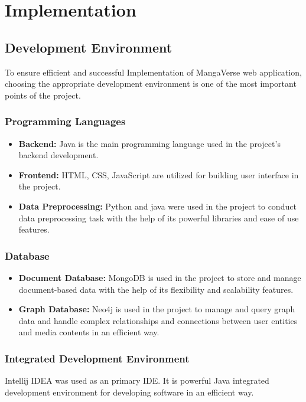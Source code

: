 \chapter{Implementation}

\section{Development Environment}
To ensure efficient and successful Implementation of MangaVerse web application,
choosing the appropriate development environment is one of the most important points of the project.

\subsection*{Programming Languages}
\begin{itemize}
    \item \textbf{Backend:} Java is the main programming language used in the project’s backend development.
    \item \textbf{Frontend:} HTML, CSS, JavaScript are utilized for building user interface in the project.
    \item \textbf{Data Preprocessing:} Python and java were used in the project to conduct data preprocessing task with the help of its powerful libraries and ease of use features. 
\end{itemize}

\subsection*{Database}
\begin{itemize}
    \item \textbf{Document Database:} MongoDB is used in the project to store and manage document-based data with the help of its flexibility and scalability features.
    \item \textbf{Graph Database:} Neo4j is used in the project to manage and query graph data and handle complex relationships and connections between user entities and media contents in an efficient way.
\end{itemize}

\subsection*{Integrated Development Environment} Intellij IDEA was used as an primary IDE. It is powerful Java 
integrated development environment for developing software in an efficient way.

